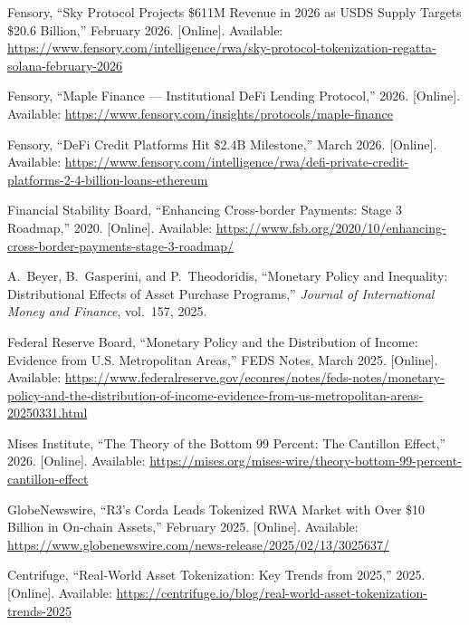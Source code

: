 \documentclass[12pt,a4paper]{report}
\begin{document}
{\begin{enumerate}[label={[\arabic*]}]
\item Fensory, ``Sky Protocol Projects \$611M Revenue in 2026 as USDS Supply Targets \$20.6 Billion,'' February 2026. [Online]. Available: \url{https://www.fensory.com/intelligence/rwa/sky-protocol-tokenization-regatta-solana-february-2026}

\item Fensory, ``Maple Finance --- Institutional DeFi Lending Protocol,'' 2026. [Online]. Available: \url{https://www.fensory.com/insights/protocols/maple-finance}

\item Fensory, ``DeFi Credit Platforms Hit \$2.4B Milestone,'' March 2026. [Online]. Available: \url{https://www.fensory.com/intelligence/rwa/defi-private-credit-platforms-2-4-billion-loans-ethereum}

\item Financial Stability Board, ``Enhancing Cross-border Payments: Stage 3 Roadmap,'' 2020. [Online]. Available: \url{https://www.fsb.org/2020/10/enhancing-cross-border-payments-stage-3-roadmap/}

\item A.~Beyer, B.~Gasperini, and P.~Theodoridis, ``Monetary Policy and Inequality: Distributional Effects of Asset Purchase Programs,'' \textit{Journal of International Money and Finance}, vol.~157, 2025.

\item Federal Reserve Board, ``Monetary Policy and the Distribution of Income: Evidence from U.S. Metropolitan Areas,'' FEDS Notes, March 2025. [Online]. Available: \url{https://www.federalreserve.gov/econres/notes/feds-notes/monetary-policy-and-the-distribution-of-income-evidence-from-us-metropolitan-areas-20250331.html}

\item Mises Institute, ``The Theory of the Bottom 99 Percent: The Cantillon Effect,'' 2026. [Online]. Available: \url{https://mises.org/mises-wire/theory-bottom-99-percent-cantillon-effect}

\item GlobeNewswire, ``R3's Corda Leads Tokenized RWA Market with Over \$10 Billion in On-chain Assets,'' February 2025. [Online]. Available: \url{https://www.globenewswire.com/news-release/2025/02/13/3025637/}

\item Centrifuge, ``Real-World Asset Tokenization: Key Trends from 2025,'' 2025. [Online]. Available: \url{https://centrifuge.io/blog/real-world-asset-tokenization-trends-2025}


\end{enumerate}}
\end{document}
